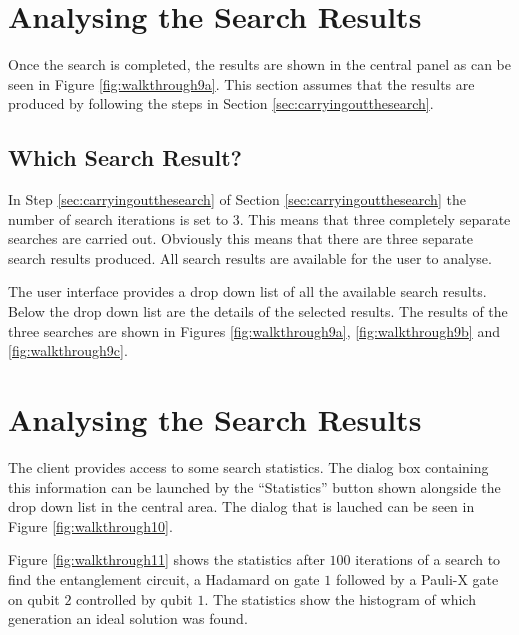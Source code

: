 \section{Analysing the Search Results}

Once the search is completed, the results are shown in the central panel as can be seen in Figure \ref{fig:walkthrough9a}.
This section assumes that the results are produced by following the steps in Section \ref{sec:carryingoutthesearch}.

\subsection{Which Search Result?}

In Step \ref{sec:carryingoutthesearch} of Section \ref{sec:carryingoutthesearch} the number of search iterations is set to 3.
This means that three completely separate searches are carried out.
Obviously this means that there are three separate search results produced.
All search results are available for the user to analyse.

The user interface provides a drop down list of all the available search results.
Below the drop down list are the details of the selected results.
The results of the three searches are shown in Figures \ref{fig:walkthrough9a}, \ref{fig:walkthrough9b} and \ref{fig:walkthrough9c}.

\section{Analysing the Search Results}

The client provides access to some search statistics.
The dialog box containing this information can be launched by the ``Statistics'' button shown alongside the drop down list in the central area.
The dialog that is lauched can be seen in Figure \ref{fig:walkthrough10}.

Figure \ref{fig:walkthrough11} shows the statistics after $100$ iterations of a search to find the entanglement circuit, a Hadamard on gate $1$ followed by a Pauli-X gate on qubit $2$ controlled by qubit $1$.
The statistics show the histogram of which generation an ideal solution was found.

\clearpage
